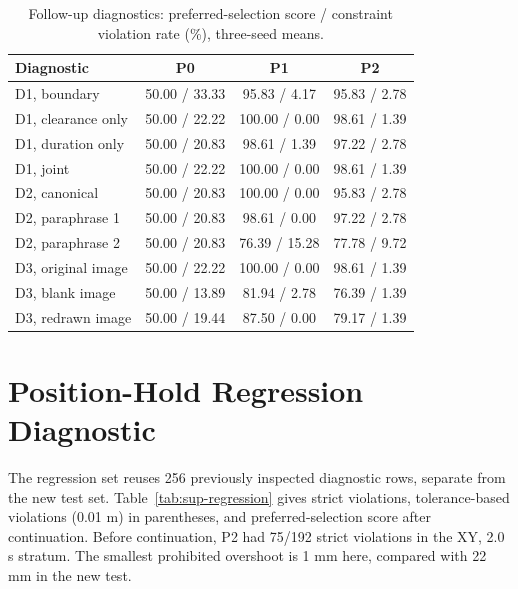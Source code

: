 \documentclass[10pt]{article}
\begin{document}
\begin{table}[h]
\centering\footnotesize
\caption{Follow-up diagnostics: preferred-selection score / constraint violation rate (\%), three-seed means.}
\label{tab:sup-diagnostics}
\begin{tabular}{lccc}
\toprule
Diagnostic & P0 & P1 & P2\\
\midrule
D1, boundary & 50.00 / 33.33 & 95.83 / 4.17 & 95.83 / 2.78\\
D1, clearance only & 50.00 / 22.22 & 100.00 / 0.00 & 98.61 / 1.39\\
D1, duration only & 50.00 / 20.83 & 98.61 / 1.39 & 97.22 / 2.78\\
D1, joint & 50.00 / 22.22 & 100.00 / 0.00 & 98.61 / 1.39\\
D2, canonical & 50.00 / 20.83 & 100.00 / 0.00 & 95.83 / 2.78\\
D2, paraphrase 1 & 50.00 / 20.83 & 98.61 / 0.00 & 97.22 / 2.78\\
D2, paraphrase 2 & 50.00 / 20.83 & 76.39 / 15.28 & 77.78 / 9.72\\
D3, original image & 50.00 / 22.22 & 100.00 / 0.00 & 98.61 / 1.39\\
D3, blank image & 50.00 / 13.89 & 81.94 / 2.78 & 76.39 / 1.39\\
D3, redrawn image & 50.00 / 19.44 & 87.50 / 0.00 & 79.17 / 1.39\\
\bottomrule
\end{tabular}
\end{table}

\section{Position-Hold Regression Diagnostic}\label{sup:regression}

The regression set reuses 256 previously inspected diagnostic rows, separate
from the new test set. Table~\ref{tab:sup-regression} gives strict violations,
tolerance-based violations (0.01 m) in parentheses, and preferred-selection score after
continuation. Before continuation, P2 had 75/192 strict violations in the
XY, 2.0 s stratum. The smallest prohibited overshoot is 1 mm here, compared
with 22 mm in the new test.
\end{document}
